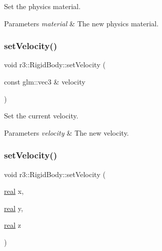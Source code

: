 Set the physics material. 


\begin{DoxyParams}{Parameters}
{\em material} & The new physics material. \\
\hline
\end{DoxyParams}
\mbox{\label{classr3_1_1_rigid_body_a033bf2bf8e128b5438fdd91f7d29c051}} 
\subsubsection{\texorpdfstring{set\+Velocity()}{setVelocity()}\hspace{0.1cm}{\footnotesize\ttfamily [1/2]}}
{\footnotesize\ttfamily void r3\+::\+Rigid\+Body\+::set\+Velocity (\begin{DoxyParamCaption}\item[{const glm\+::vec3 \&}]{velocity }\end{DoxyParamCaption})}



Set the current velocity. 


\begin{DoxyParams}{Parameters}
{\em velocity} & The new velocity. \\
\hline
\end{DoxyParams}
\mbox{\label{classr3_1_1_rigid_body_a244d24ec2368098f4ac38603a982ea54}} 
\subsubsection{\texorpdfstring{set\+Velocity()}{setVelocity()}\hspace{0.1cm}{\footnotesize\ttfamily [2/2]}}
{\footnotesize\ttfamily void r3\+::\+Rigid\+Body\+::set\+Velocity (\begin{DoxyParamCaption}\item[{\mbox{\hyperlink{namespacer3_ab2016b3e3f743fb735afce242f0dc1eb}{real}}}]{x,  }\item[{\mbox{\hyperlink{namespacer3_ab2016b3e3f743fb735afce242f0dc1eb}{real}}}]{y,  }\item[{\mbox{\hyperlink{namespacer3_ab2016b3e3f743fb735afce242f0dc1eb}{real}}}]{z }\end{DoxyParamCaption})}



